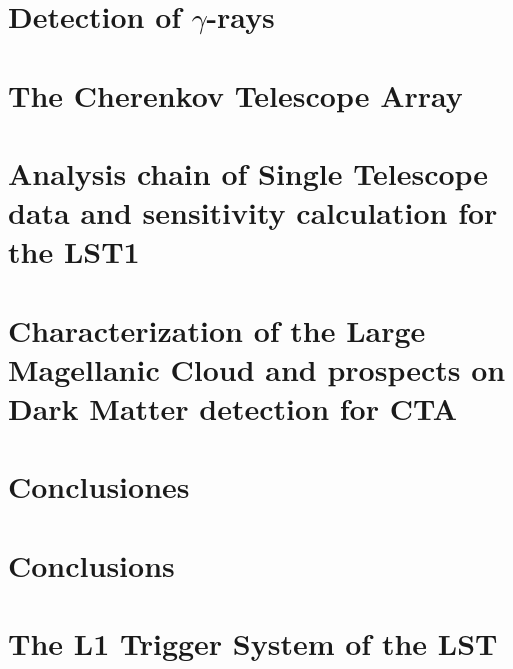 \documentclass[12pt,fleqn,aas_macros]{book} %
\begin{document}

\chapter{Detection of $\gamma$-rays}
 \label{cap:detection}


\chapter{The Cherenkov Telescope Array} \label{cap:CTA}




\chapter[Analysis chain of Single Telescope data and sensitivity calculation for the LST1]{Analysis chain of Single Telescope data and sensitivity calculation for the LST1} \label{cap:LST1}



\chapter[Characterization of the Large Magellanic Cloud at TeV energies and prospects on Dark Matter detection for CTA]{Characterization of the Large Magellanic Cloud and prospects on Dark Matter detection for CTA}
\label{cap:LMC}



\newpage
\pagestyle{empty} %
\chapter*{Conclusiones}


\newpage
\pagestyle{empty} %
\chapter*{Conclusions}


\appendix
{} %
\chapter[The L1 Trigger System of the LST1]{The L1 Trigger System of the LST}
\label{app:trigger}

\end{document}
